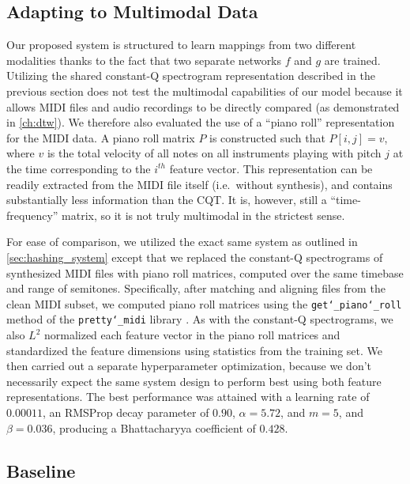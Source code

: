 \subsection{Adapting to Multimodal Data}
\label{sec:multimodal}

Our proposed system is structured to learn mappings from two different modalities thanks to the fact that two separate networks $f$ and $g$ are trained.
Utilizing the shared constant-Q spectrogram representation described in the previous section does not test the multimodal capabilities of our model because it allows MIDI files and audio recordings to be directly compared (as demonstrated in \cref{ch:dtw}).
We therefore also evaluated the use of a ``piano roll'' representation for the MIDI data.
A piano roll matrix $P$ is constructed such that $P[i, j] = v$, where $v$ is the total velocity of all notes on all instruments playing with pitch $j$ at the time corresponding to the $i^{th}$ feature vector.
This representation can be readily extracted from the MIDI file itself (i.e.\ without synthesis), and contains substantially less information than the CQT.
It is, however, still a ``time-frequency'' matrix, so it is not truly multimodal in the strictest sense.

For ease of comparison, we utilized the exact same system as outlined in \cref{sec:hashing_system} except that we replaced the constant-Q spectrograms of synthesized MIDI files with piano roll matrices, computed over the same timebase and range of semitones.
Specifically, after matching and aligning files from the clean MIDI subset, we computed piano roll matrices using the \texttt{get\char`_piano\char`_roll} method of the \texttt{pretty\char`_midi} library \cite{raffel2014pretty_midi}.
As with the constant-Q spectrograms, we also $L^2$ normalized each feature vector in the piano roll matrices and standardized the feature dimensions using statistics from the training set.
We then carried out a separate hyperparameter optimization, because we don't necessarily expect the same system design to perform best using both feature representations.
The best performance was attained with a learning rate of $0.00011$, an RMSProp decay parameter of $0.90$, $\alpha = 5.72$, and $m = 5$, and $\beta = 0.036$, producing a Bhattacharyya coefficient of $0.428$.

\subsection{Baseline}
\label{sec:baseline}

